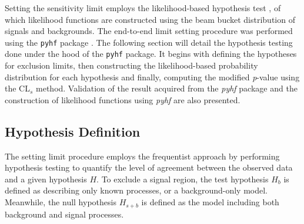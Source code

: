 Setting the sensitivity limit employs the likelihood-based hypothesis test \cite{asymptotic_test}, of which likelihood functions are constructed using the beam bucket distribution of signals and backgrounds.
The end-to-end limit setting procedure was performed using the \texttt{pyhf} package \cite{pyhf, pyhf_joss}.
The following section will detail the hypothesis testing done under the hood of the \texttt{pyhf} package.
It begins with defining the hypotheses for exclusion limits, then constructing the likelihood-based probability distribution for each hypothesis and finally, computing the modified \textit{p}-value using the CL$_{s}$ method.
Validation of the result acquired from the \textit{pyhf} package and the construction of likelihood functions using \textit{pyhf} are also presented.


\subsection{Hypothesis Definition}

The setting limit procedure employs the frequentist approach by performing hypothesis testing to quantify the level of agreement between the observed data and a given hypothesis $H$.
To exclude a signal region, the test hypothesis $H_{b}$ is defined as describing only known processes, or a background-only model.
Meanwhile, the null hypothesis $H_{s+b}$ is defined as the model including both background and signal processes.

